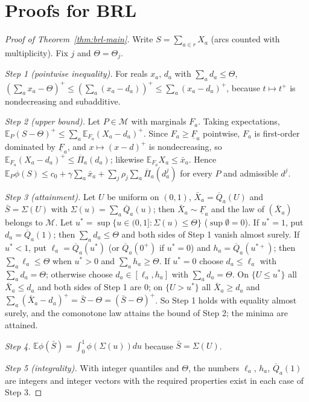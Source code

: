 \documentclass[preprint,11pt]{elsarticle}
\theoremstyle{definition}
\theoremstyle{remark}
\newcommand{\E}{\mathbb{E}}
\newcommand{\cM}{\mathcal{M}}
\newcommand{\Qb}{\overline{Q}}
\newcommand{\Fl}{\underline{F}}
\newcommand{\Pib}{\overline{\Pi}}
\newcommand{\xb}{\bar x}
\newcommand{\pos}[1]{\left(#1\right)^{+}}
\begin{document}
\section{Proofs for BRL}\label{app:brl}

\begin{proof}[Proof of Theorem~\ref{thm:brl-main}]
Write $S=\sum_{a\in r}X_a$ (arcs counted with multiplicity). Fix $j$ and $\Theta=\Theta_j$.

\emph{Step 1 (pointwise inequality).} For reals $x_a$, $d_a$ with $\sum_ad_a\le\Theta$, $\pos{\sum_ax_a-\Theta}\le\pos{\sum_a(x_a-d_a)}\le\sum_a\pos{x_a-d_a}$, because $t\mapsto t^+$ is nondecreasing and subadditive.

\emph{Step 2 (upper bound).} Let $P\in\cM$ with marginals $F_a$. Taking expectations, $\E_P\pos{S-\Theta}\le\sum_a\E_{F_a}\pos{X_a-d_a}$. Since $F_a\ge\Fl_a$ pointwise, $F_a$ is first-order dominated by $\Fl_a$, and $x\mapsto\pos{x-d}$ is nondecreasing, so $\E_{F_a}\pos{X_a-d_a}\le\Pib_a(d_a)$; likewise $\E_{F_a}X_a\le\xb_a$. Hence $\E_P\phi(S)\le c_0+\gamma\sum_a\xb_a+\sum_j\rho_j\sum_a\Pib_a(d^j_a)$ for every $P$ and admissible $d^j$.

\emph{Step 3 (attainment).} Let $U$ be uniform on $(0,1)$, $\bar X_a=\Qb_a(U)$ and $\bar S=\Sigma(U)$ with $\Sigma(u)=\sum_a\Qb_a(u)$; then $\bar X_a\sim\Fl_a$ and the law of $(\bar X_a)$ belongs to $\cM$. Let $u^*=\sup\{u\in(0,1]:\Sigma(u)\le\Theta\}$ ($\sup\emptyset=0$). If $u^*=1$, put $d_a=\Qb_a(1)$; then $\sum_ad_a\le\Theta$ and both sides of Step 1 vanish almost surely. If $u^*<1$, put $\ell_a=\Qb_a(u^*)$ (or $\Qb_a(0^+)$ if $u^*=0$) and $h_a=\Qb_a(u^{*+})$; then $\sum_a\ell_a\le\Theta$ when $u^*>0$ and $\sum_ah_a\ge\Theta$. If $u^*=0$ choose $d_a\le\ell_a$ with $\sum_ad_a=\Theta$; otherwise choose $d_a\in[\ell_a,h_a]$ with $\sum_ad_a=\Theta$. On $\{U\le u^*\}$ all $\bar X_a\le d_a$ and both sides of Step 1 are $0$; on $\{U>u^*\}$ all $\bar X_a\ge d_a$ and $\sum_a\pos{\bar X_a-d_a}=\bar S-\Theta=\pos{\bar S-\Theta}$. So Step 1 holds with equality almost surely, and the comonotone law attains the bound of Step 2; the minima are attained.

\emph{Step 4.} $\E\phi(\bar S)=\int_0^1\phi(\Sigma(u))du$ because $\bar S=\Sigma(U)$.

\emph{Step 5 (integrality).} With integer quantiles and $\Theta$, the numbers $\ell_a$, $h_a$, $\Qb_a(1)$ are integers and integer vectors with the required properties exist in each case of Step 3.
\end{proof}
\end{document}
